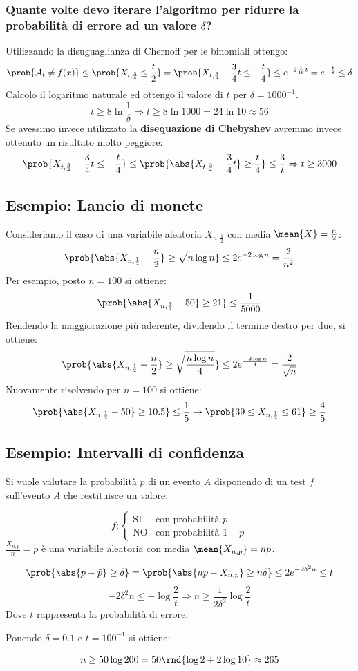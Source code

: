 \documentclass[\main/main.tex]{subfiles}
\begin{document}
\subsubsection{Quante volte devo iterare l'algoritmo per ridurre la probabilità di errore ad un valore \(\delta \)?}
Utilizzando la disuguaglianza di Chernoff per le binomiali ottengo:
\[
  \prob{\mathcal{A}_t \neq f(x)} \leq \prob{X_{t, \frac{3}{4}} \leq \frac{t}{2}} = \prob{X_{t,\frac{3}{4}} - \frac{3}{4}t \leq -\frac{t}{4}} \leq e^{-2\frac{1}{16}t} = e^{-\frac{t}{8}} \leq \delta
\]
Calcolo il logaritmo naturale ed ottengo il valore di \(t\) per \(\delta = 1000^{-1}\).
\[
  t \geq 8\ln{\frac{1}{\delta}} \Rightarrow t \geq 8 \ln{1000} = 24 \ln{10} \approx 56
\]
Se avessimo invece utilizzato la \textbf{disequazione di Chebyshev} avremmo invece ottenuto un risultato molto peggiore:
\[
  \prob{X_{t, \frac{3}{4}} - \frac{3}{4}t \leq -\frac{t}{4}} \leq \prob{\abs{X_{t, \frac{3}{4}} - \frac{3}{4}t} \geq \frac{t}{4}} \leq \frac{3}{t} \Rightarrow t \geq 3000
\]

\subsection{Esempio: Lancio di monete}
Consideriamo il caso di una variabile aleatoria \(X_{n, \frac{1}{2}}\) con media \(\mean{X} = \frac{n}{2}\):
\[
  \prob{\abs{X_{n, \frac{1}{2}} - \frac{n}{2}} \geq \sqrt{n\log{n}}} \leq 2e^{-2\log{n}} = \frac{2}{n^2}
\]
Per esempio, posto \(n=100\) si ottiene:
\[
  \prob{\abs{X_{n, \frac{1}{2}} - 50} \geq 21} \leq \frac{1}{5000}
\]
Rendendo la maggiorazione più aderente, dividendo il termine destro per due, si ottiene:
\[
  \prob{\abs{X_{n, \frac{1}{2}} - \frac{n}{2}} \geq \sqrt{\frac{n\log{n}}{4}}} \leq 2e^{\frac{-2\log{n}}{4}} = \frac{2}{\sqrt{n}}
\]
Nuovamente risolvendo per \(n=100\) si ottiene:
\[
  \prob{\abs{X_{n, \frac{1}{2}} - 50} \geq 10.5} \leq \frac{1}{5} \rightarrow \prob{39 \leq X_{n, \frac{1}{2}} \leq 61} \geq \frac{4}{5}
\]
\subsection{Esempio: Intervalli di confidenza}
Si vuole valutare la probabilità \(p\) di un evento \(A\) disponendo di un test \(f\) sull'evento \(A\) che restituisce un valore:

\[
  f: \begin{cases}
    \text{SI} & \text{con probabilità } p   \\
    \text{NO} & \text{con probabilità } 1-p
  \end{cases}
\]
\(\frac{X_{n,p}}{n} = \bar{p}\) è una variabile aleatoria con media \(\mean{X_{n,p}} = np\).

\[
  \prob{\abs{p-\bar{p}}\geq \delta} = \prob{\abs{np - X_{n,p}}\geq n\delta} \leq 2e^{-2\delta^2 n} \leq t
\]
\[
  -2\delta^2 n \leq -\log{\frac{2}{t}} \Rightarrow n \geq \frac{1}{2\delta^2}\log{\frac{2}{t}}
\]
Dove \(t\) rappresenta la probabilità di errore.

Ponendo \(\delta = 0.1\) e \(t = 100^{-1}\) si ottiene:

\[
  n \geq 50\log{200} = 50\rnd{\log{2} + 2\log{10}} \approx 265
\]
\end{document}
